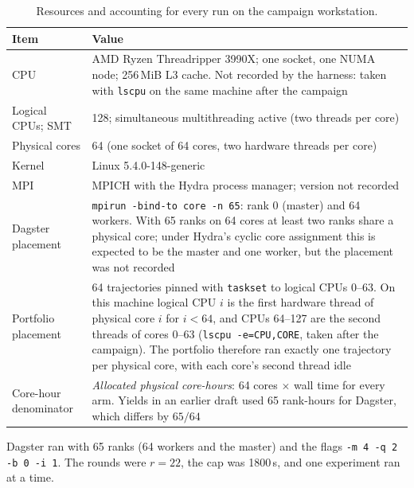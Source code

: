 \documentclass[11pt,a4paper]{article}
\newcommand{\flag}[1]{\texttt{#1}}
\begin{document}
\begin{table}[h]\centering\small
\begin{tabularx}{\textwidth}{@{}lL@{}}
\toprule
\textbf{Item} & \textbf{Value}\\
\midrule
CPU & AMD Ryzen Threadripper 3990X; one socket, one NUMA node; 256\,MiB L3 cache. Not recorded by the harness: taken with \texttt{lscpu} on the same machine after the campaign\\
Logical CPUs; SMT & 128; simultaneous multithreading active (two threads per core)\\
Physical cores & 64 (one socket of 64 cores, two hardware threads per core)\\
Kernel & Linux 5.4.0-148-generic\\
MPI & MPICH with the Hydra process manager; version not recorded\\
Dagster placement & \texttt{mpirun -bind-to core -n 65}: rank 0 (master) and 64 workers. With 65 ranks
on 64 cores at least two ranks share a physical core; under Hydra's cyclic core assignment this is
expected to be the master and one worker, but the placement was not recorded\\
Portfolio placement & 64 trajectories pinned with \texttt{taskset} to logical CPUs 0--63. On this
machine logical CPU $i$ is the first hardware thread of physical core $i$ for $i<64$, and CPUs 64--127
are the second threads of cores 0--63 (\texttt{lscpu -e=CPU,CORE}, taken after the campaign). The
portfolio therefore ran exactly one trajectory per physical core, with each core's second thread
idle\\
Core-hour denominator & \emph{Allocated physical core-hours}: 64 cores $\times$ wall time for every
arm. Yields in an earlier draft used 65 rank-hours for Dagster, which differs by $65/64$\\
\bottomrule
\end{tabularx}
\caption{Resources and accounting for every run on the campaign workstation.}
\label{tab:res}
\end{table}

Dagster ran with 65 ranks (64 workers and the master) and the flags \flag{-m 4 -q 2 -b 0 -i 1}. The
rounds were $r=22$, the cap was 1800\,s, and one experiment ran at a time.
\end{document}
